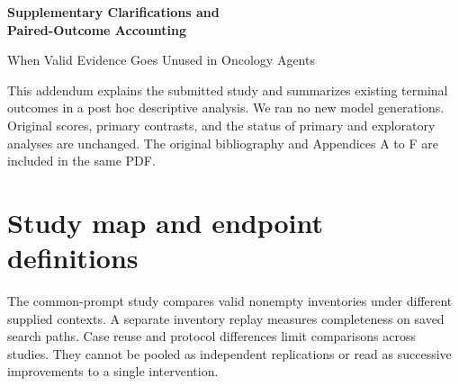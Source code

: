 \documentclass[11pt]{article}
\begin{document}
\begin{center}
{\Large\bfseries Supplementary Clarifications and\\Paired-Outcome Accounting}\par\medskip
When Valid Evidence Goes Unused in Oncology Agents
\end{center}

This addendum explains the submitted study and summarizes existing terminal
outcomes in a post hoc descriptive analysis. We ran no new model generations.
Original scores, primary contrasts, and the status of primary and exploratory
analyses are unchanged. The original bibliography and Appendices A to F are
included in the same PDF.

\section{Study map and endpoint definitions}

The common-prompt study compares valid nonempty inventories under different
supplied contexts. A separate inventory replay measures completeness on saved
search paths. Case reuse and protocol differences limit comparisons across
studies. They cannot be pooled as independent replications or read as successive
improvements to a single intervention.
\end{document}
